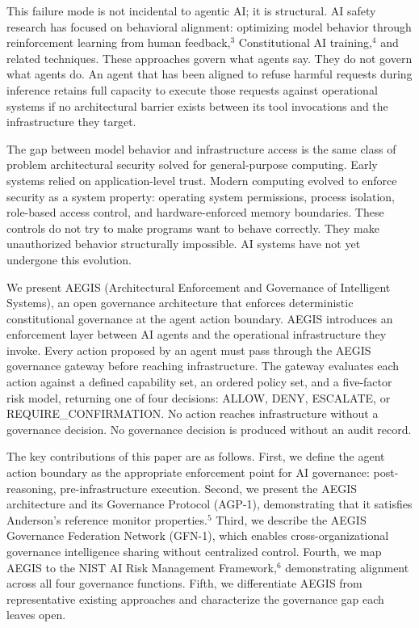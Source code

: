 \documentclass{IEEEcsmag}
\begin{document}
This failure mode is not incidental to agentic AI; it is structural. AI safety research has focused on behavioral alignment: optimizing model behavior through reinforcement learning from human feedback,$^{3}$ Constitutional AI training,$^{4}$ and related techniques. These approaches govern what agents say. They do not govern what agents do. An agent that has been aligned to refuse harmful requests during inference retains full capacity to execute those requests against operational systems if no architectural barrier exists between its tool invocations and the infrastructure they target.

The gap between model behavior and infrastructure access is the same class of problem architectural security solved for general-purpose computing. Early systems relied on application-level trust. Modern computing evolved to enforce security as a system property: operating system permissions, process isolation, role-based access control, and hardware-enforced memory boundaries. These controls do not try to make programs want to behave correctly. They make unauthorized behavior structurally impossible. AI systems have not yet undergone this evolution.

We present AEGIS (Architectural Enforcement and Governance of Intelligent Systems), an open governance architecture that enforces deterministic constitutional governance at the agent action boundary. AEGIS introduces an enforcement layer between AI agents and the operational infrastructure they invoke. Every action proposed by an agent must pass through the AEGIS governance gateway before reaching infrastructure. The gateway evaluates each action against a defined capability set, an ordered policy set, and a five-factor risk model, returning one of four decisions: ALLOW, DENY, ESCALATE, or REQUIRE\_CONFIRMATION. No action reaches infrastructure without a governance decision. No governance decision is produced without an audit record.

The key contributions of this paper are as follows. First, we define the agent action boundary as the appropriate enforcement point for AI governance: post-reasoning, pre-infrastructure execution. Second, we present the AEGIS architecture and its Governance Protocol (AGP-1), demonstrating that it satisfies Anderson's reference monitor properties.$^{5}$ Third, we describe the AEGIS Governance Federation Network (GFN-1), which enables cross-organizational governance intelligence sharing without centralized control. Fourth, we map AEGIS to the NIST AI Risk Management Framework,$^{6}$ demonstrating alignment across all four governance functions. Fifth, we differentiate AEGIS from representative existing approaches and characterize the governance gap each leaves open.
\end{document}
